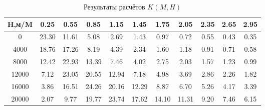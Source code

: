 \begin{table}[H]
\centering
\caption{Результаты расчётов $K(M,H)$}
\label{K}
\begin{tabular}{|c|c|c|c|c|c|c|c|c|c|c|}
\toprule
H,м/M &   0.25 &   0.55 &   0.85 &   1.15 &   1.45 &   1.75 &   2.05 &  2.35 &  2.65 &  2.95 \\
\midrule
0     &  23.30 &  11.61 &   5.08 &   2.69 &   1.43 &   0.97 &   0.72 &  0.55 &  0.43 &  0.35 \\
4000  &  18.76 &  17.26 &   8.19 &   4.39 &   2.34 &   1.60 &   1.18 &  0.91 &  0.71 &  0.58 \\
8000  &  12.42 &  22.93 &  13.39 &   7.46 &   4.02 &   2.75 &   2.03 &  1.57 &  1.23 &  0.99 \\
12000 &   7.12 &  23.05 &  20.55 &  12.94 &   7.18 &   4.98 &   3.69 &  2.86 &  2.26 &  1.82 \\
16000 &   3.86 &  16.51 &  24.26 &  20.16 &  12.29 &   8.87 &   6.70 &  5.26 &  4.17 &  3.39 \\
20000 &   2.07 &   9.77 &  19.77 &  23.74 &  17.62 &  14.10 &  11.31 &  9.20 &  7.46 &  6.15 \\
\bottomrule
\end{tabular}
\end{table}
